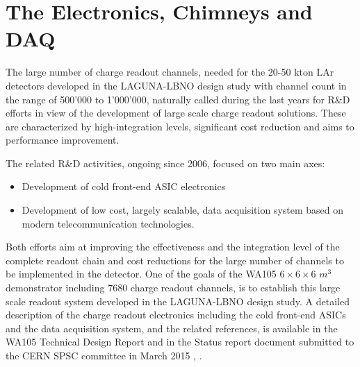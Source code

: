 \section{The Electronics, Chimneys and DAQ}
\label{sec:detectors-fd-alt-elec}

The large number of charge readout channels, needed for the 20-50 kton LAr detectors developed in the LAGUNA-LBNO design study  with channel count in the range of 500'000 to 1'000'000, naturally called during the last years for R\&D efforts in view of the development of large scale charge readout solutions. These are characterized by high-integration levels, significant cost reduction and aims to performance improvement. 

The related R\&D activities, ongoing since 2006, focused on two main axes:
\begin {itemize} 
\item{Development of cold front-end ASIC electronics}
\item{Development of low cost, largely scalable, data acquisition system based on modern telecommunication technologies.}
\end{itemize}

Both efforts aim at improving the effectiveness and the integration level of the complete readout chain and cost reductions for the large number of channels to be implemented in the detector. One of the goals of the WA105  $6 \times 6 \times  6$ $m^3$ demonstrator including 7680 charge readout channels, is to establish this large scale readout system developed in the LAGUNA-LBNO design study. A detailed description of the charge readout electronics including the cold front-end ASICs and the data acquisition system, and the related references, is available in the WA105 Technical Design Report and in the Status report document submitted to the CERN SPSC committee in March 2015 \cite{WA105_TDR}, \cite{WA105_SREP} .

